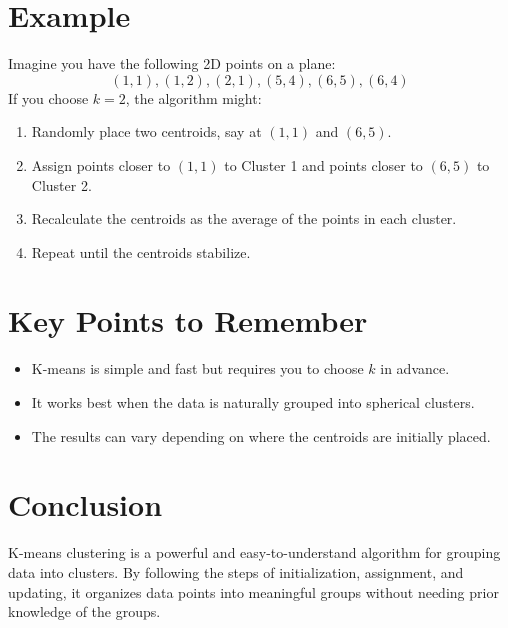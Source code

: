 \documentclass{article}
\begin{document}
	\section{Example}
	Imagine you have the following 2D points on a plane:
	\[
	(1, 1), (1, 2), (2, 1), (5, 4), (6, 5), (6, 4)
	\]
	If you choose \( k = 2 \), the algorithm might:
	\begin{enumerate}
		\item Randomly place two centroids, say at \( (1, 1) \) and \( (6, 5) \).
		\item Assign points closer to \( (1, 1) \) to Cluster 1 and points closer to \( (6, 5) \) to Cluster 2.
		\item Recalculate the centroids as the average of the points in each cluster.
		\item Repeat until the centroids stabilize.
	\end{enumerate}
	
	\section{Key Points to Remember}
	\begin{itemize}
		\item K-means is simple and fast but requires you to choose \( k \) in advance.
		\item It works best when the data is naturally grouped into spherical clusters.
		\item The results can vary depending on where the centroids are initially placed.
	\end{itemize}
	
	\section{Conclusion}
	K-means clustering is a powerful and easy-to-understand algorithm for grouping data into clusters. By following the steps of initialization, assignment, and updating, it organizes data points into meaningful groups without needing prior knowledge of the groups.
	
\end{document}
